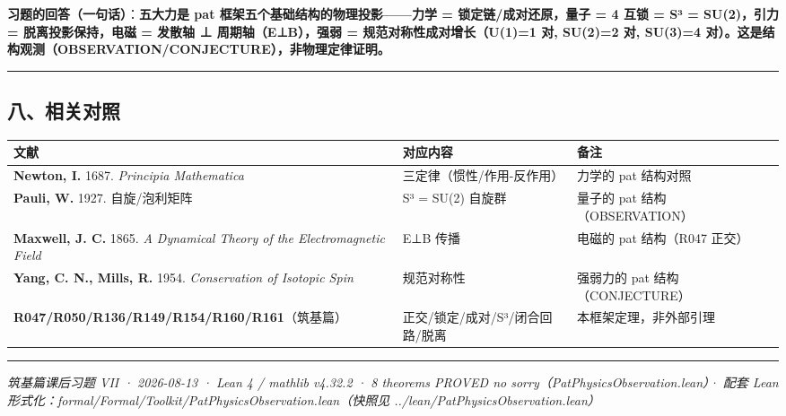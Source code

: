 \documentclass[
]{article}
\newcounter{none} %
\begin{document}
\textbf{习题的回答（一句话）}：\textbf{五大力是 pat
框架五个基础结构的物理投影------力学 = 锁定链/成对还原，量子 = 4 互锁 =
S³ = SU(2)，引力 = 脱离投影保持，电磁 = 发散轴 ⊥ 周期轴（E⊥B），强弱 =
规范对称性成对增长（U(1)=1 对, SU(2)=2 对, SU(3)=4
对）。这是结构观测（OBSERVATION/CONJECTURE），非物理定律证明。}

\begin{center}\rule{0.5\linewidth}{0.5pt}\end{center}

\subsection{八、相关对照}\label{ux516bux76f8ux5173ux5bf9ux7167}

{\def\LTcaptype{none} %
\begin{longtable}[]{@{}
  >{\raggedright\arraybackslash}p{}
  >{\raggedright\arraybackslash}p{}
  >{\raggedright\arraybackslash}p{}@{}}
\toprule\noalign{}
\begin{minipage}[b]{\linewidth}\raggedright
文献
\end{minipage} & \begin{minipage}[b]{\linewidth}\raggedright
对应内容
\end{minipage} & \begin{minipage}[b]{\linewidth}\raggedright
备注
\end{minipage} \\
\midrule\noalign{}
\endhead
\bottomrule\noalign{}
\endlastfoot
\textbf{Newton, I.} 1687. \emph{Principia Mathematica} &
三定律（惯性/作用-反作用） & 力学的 pat 结构对照 \\
\textbf{Pauli, W.} 1927. 自旋/泡利矩阵 & S³ = SU(2) 自旋群 & 量子的 pat
结构（OBSERVATION） \\
\textbf{Maxwell, J. C.} 1865. \emph{A Dynamical Theory of the
Electromagnetic Field} & E⊥B 传播 & 电磁的 pat 结构（R047 正交） \\
\textbf{Yang, C. N., Mills, R.} 1954. \emph{Conservation of Isotopic
Spin} & 规范对称性 & 强弱力的 pat 结构（CONJECTURE） \\
\textbf{R047/R050/R136/R149/R154/R160/R161}（筑基篇） &
正交/锁定/成对/S³/闭合回路/脱离 & 本框架定理，非外部引理 \\
\end{longtable}
}

\begin{center}\rule{0.5\linewidth}{0.5pt}\end{center}

\emph{筑基篇课后习题 VII · 2026-08-13 · Lean 4 / mathlib v4.32.2 · 8
theorems PROVED no sorry（PatPhysicsObservation.lean）· 配套 Lean
形式化：formal/Formal/Toolkit/PatPhysicsObservation.lean（快照见
../lean/PatPhysicsObservation.lean）}
\end{document}
